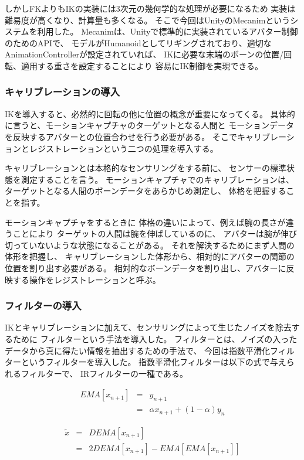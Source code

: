\documentclass[a4j]{jsarticle}
\begin{document}
しかしFKよりもIKの実装には3次元の幾何学的な処理が必要になるため
実装は難易度が高くなり、計算量も多くなる。
そこで今回はUnityのMecanimというシステムを利用した。
Mecanimは、Unityで標準的に実装されているアバター制御のためのAPIで、
モデルがHumanoidとしてリギングされており、適切なAnimationControllerが設定されていれば、
IKに必要な末端のボーンの位置/回転、適用する重さを設定することにより
容易にIK制御を実現できる。


\subsubsection{キャリブレーションの導入}

IKを導入すると、必然的に回転の他に位置の概念が重要になってくる。
具体的に言うと、モーションキャプチャのターゲットとなる人間と
モーションデータを反映するアバターとの位置合わせを行う必要がある。
そこでキャリブレーションとレジストレーションという二つの処理を導入する。

キャリブレーションとは本格的なセンサリングをする前に、
センサーの標準状態を測定することを言う。
モーションキャプチャでのキャリブレーションは、
ターゲットとなる人間のボーンデータをあらかじめ測定し、
体格を把握することを指す。

モーションキャプチャをするときに
体格の違いによって、例えば腕の長さが違うことにより
ターゲットの人間は腕を伸ばしているのに、
アバターは腕が伸び切っていないような状態になることがある。
それを解決するためにまず人間の体形を把握し、
キャリブレーションした体形から、相対的にアバターの関節の位置を割り出す必要がある。
相対的なボーンデータを割り出し、アバターに反映する操作をレジストレーションと呼ぶ。

\subsubsection{フィルターの導入}

IKとキャリブレーションに加えて、センサリングによって生じたノイズを除去するために
フィルターという手法を導入した。
フィルターとは、ノイズの入ったデータから真に得たい情報を抽出するための手法で、
今回は指数平滑化フィルターというフィルターを導入した。
指数平滑化フィルターは以下の式で与えられるフィルターで、
IRフィルターの一種である。

\begin{eqnarray*}
EMA[x_{n+1}] &=& y_{n+1} \\
             &=& \alpha x_{n+1} + (1-\alpha)y_{n}
\end{eqnarray*}

\begin{eqnarray*}
\tilde{x} &=& DEMA[x_{n+1}] \\
          &=& 2DEMA[x_{n+1}]-EMA[EMA[x_{n+1}]]
\end{eqnarray*}
\end{document}
